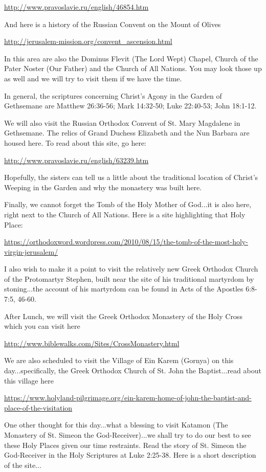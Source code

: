 \documentclass[letterpaper]{report}
\begin{document}
\url{http://www.pravoslavie.ru/english/46854.htm}

And here is a history of the Russian Convent on the Mount of Olives

\url{http://jerusalem-mission.org/convent_ascension.html}

In this area are also the Dominus Flevit (The Lord Wept) Chapel, Church of the Pater Noster (Our Father) and the Church of All Nations. You may look those up as well and we will try to visit them if we have the time.

In general, the scriptures concerning Christ's Agony in the Garden of Gethsemane are Matthew 26:36-56; Mark 14:32-50; Luke 22:40-53; John 18:1-12.

We will also visit the Russian Orthodox Convent of St. Mary Magdalene in Gethsemane. The relics of Grand Duchess Elizabeth and the Nun Barbara are housed here. To read about this site, go here:

\url{http://www.pravoslavie.ru/english/63239.htm}

Hopefully, the sisters can tell us a little about the traditional location of Christ's Weeping in the Garden and why the monastery was built here.

Finally, we cannot forget the Tomb of the Holy Mother of God...it is also here, right next to the Church of All Nations. Here is a site highlighting that Holy Place:

\url{https://orthodoxword.wordpress.com/2010/08/15/the-tomb-of-the-most-holy-virgin-jerusalem/}

I also wish to make it a point to visit the relatively new Greek Orthodox Church of the Protomartyr Stephen, built near the site of his traditional martyrdom by stoning...the account of his martyrdom can be found in Acts of the Apostles 6:8-7:5, 46-60.

After Lunch, we will visit the Greek Orthodox Monastery of the Holy Cross which you can visit here

\url{http://www.biblewalks.com/Sites/CrossMonastery.html}

We are also scheduled to visit the Village of Ein Karem (Gornya) on this day...specifically, the Greek Orthodox Church of St. John the Baptist...read about this village here

\url{https://www.holyland-pilgrimage.org/ein-karem-home-of-john-the-baptist-and-place-of-the-visitation}

One other thought for this day...what a blessing to visit Katamon (The Monastery of St. Simeon the God-Receiver)...we shall try to do our best to see these Holy Places given our time restraints. Read the story of St. Simeon the God-Receiver in the Holy Scriptures at Luke 2:25-38. Here is a short description of the site...
\end{document}
